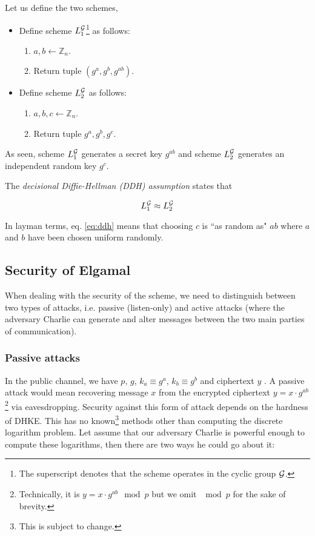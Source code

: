Let us define the two schemes,

\begin{itemize}
    \item Define scheme \( L_1^{\mathcal{G}} \)\footnote{The superscript denotes that the scheme operates in the cyclic group \( \mathcal{G} \).} as follows: 
    \begin{enumerate}
        \item \( a, b \leftarrow \mathbb{Z}_n \).
        \item Return tuple \( (g^a, g^b, g^{ab}) \).
    \end{enumerate}

    \item Define scheme \( L_2^{\mathcal{G}} \) as follows: 
    \begin{enumerate}
        \item \( a, b, c \leftarrow \mathbb{Z}_n \).
        \item Return tuple \( g^a, g^b, g^c \).
    \end{enumerate}
\end{itemize}

As seen, scheme \( L_1^{\mathcal{G}} \) generates a secret key \( g^{ab} \) and scheme \( L_2^{\mathcal{G}} \) generates an independent random key \( g^c \).

The \textit{decisional Diffie-Hellman (DDH) assumption} states that

\begin{equation} \label{eq:ddh} 
    L_1^{\mathcal{G}} \approx L_2^{\mathcal{G}}
\end{equation}

In layman terms, eq. \ref{eq:ddh} means that choosing \( c \) is ``as random as" \( ab \) where \( a \) and \( b \) have been chosen uniform randomly.

\subsection{Security of Elgamal}

When dealing with the security of the scheme, we need to distinguish between two types of attacks, i.e. passive (listen-only) and active attacks (where the adversary Charlie can generate and alter messages between the two main parties of communication).

\subsubsection{Passive attacks}

In the public channel, we have \( p \), \( g \), \( k_a \equiv g^a \), \( k_b \equiv g^b \) and ciphertext \( y \) . A passive attack would mean recovering message \( x \) from the encrypted ciphertext \( y = x \cdot g^{ab} \)\textsuperscript{   }\footnote{Technically, it is \( y = x \cdot g^{ab} \mod p \) but we omit \( \mod p \) for the sake of brevity.} via eavesdropping.
Security against this form of attack depends on the hardness of DHKE. 
This has no known\footnote{This is subject to change.} methods other than computing the discrete logarithm problem.
Let assume that our adversary Charlie is powerful enough to compute these logarithms, then there are two ways he could go about it:

